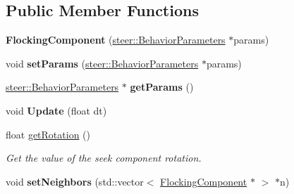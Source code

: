 \subsection*{Public Member Functions}
\begin{DoxyCompactItemize}
\item 
\hypertarget{classsteer_1_1_flocking_component_a88df12e71eb24d0d8e43532f49ab38d0}{{\bfseries Flocking\-Component} (\hyperlink{structsteer_1_1_behavior_parameters}{steer\-::\-Behavior\-Parameters} $\ast$params)}\label{classsteer_1_1_flocking_component_a88df12e71eb24d0d8e43532f49ab38d0}

\item 
\hypertarget{classsteer_1_1_flocking_component_ad48b93c8e56858a90febd09b0c3f67eb}{void {\bfseries set\-Params} (\hyperlink{structsteer_1_1_behavior_parameters}{steer\-::\-Behavior\-Parameters} $\ast$params)}\label{classsteer_1_1_flocking_component_ad48b93c8e56858a90febd09b0c3f67eb}

\item 
\hypertarget{classsteer_1_1_flocking_component_a07be5adc3a5c2462d5b0ab5a9fa02638}{\hyperlink{structsteer_1_1_behavior_parameters}{steer\-::\-Behavior\-Parameters} $\ast$ {\bfseries get\-Params} ()}\label{classsteer_1_1_flocking_component_a07be5adc3a5c2462d5b0ab5a9fa02638}

\item 
\hypertarget{classsteer_1_1_flocking_component_a9f6b56e3dbe9278fe7e6dd4594e39d68}{void {\bfseries Update} (float dt)}\label{classsteer_1_1_flocking_component_a9f6b56e3dbe9278fe7e6dd4594e39d68}

\item 
\hypertarget{classsteer_1_1_flocking_component_ad0ba21cd64f3c44208f221f3d7549062}{float \hyperlink{classsteer_1_1_flocking_component_ad0ba21cd64f3c44208f221f3d7549062}{get\-Rotation} ()}\label{classsteer_1_1_flocking_component_ad0ba21cd64f3c44208f221f3d7549062}

\begin{DoxyCompactList}\small\item\em Get the value of the seek component rotation. \end{DoxyCompactList}\item 
\hypertarget{classsteer_1_1_flocking_component_aa5f923728cfe57c6fd73967e40f548e2}{void {\bfseries set\-Neighbors} (std\-::vector$<$ \hyperlink{classsteer_1_1_flocking_component}{Flocking\-Component} $\ast$ $>$ $\ast$n)}\label{classsteer_1_1_flocking_component_aa5f923728cfe57c6fd73967e40f548e2}


\end{DoxyCompactItemize}
